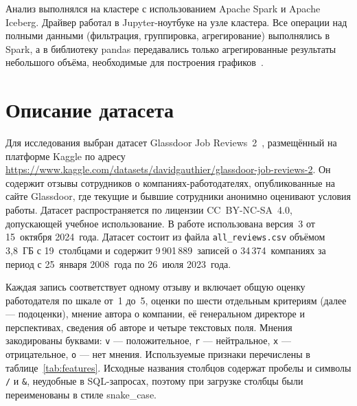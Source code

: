 Анализ выполнялся на кластере с использованием Apache Spark и Apache Iceberg. Драйвер работал в Jupyter-ноутбуке на узле кластера. Все операции над полными данными (фильтрация, группировка, агрегирование) выполнялись в Spark, а в библиотеку pandas передавались только агрегированные результаты небольшого объёма, необходимые для построения графиков~\cite{koirala2020pyspark, feng2021learning}.

\vspace{\baselineskip}\section{Описание датасета}\vspace{\baselineskip}

Для исследования выбран датасет Glassdoor Job Reviews~2~\cite{gauthier2024glassdoor}, размещённый на платформе Kaggle по адресу \url{https://www.kaggle.com/datasets/davidgauthier/glassdoor-job-reviews-2}. Он содержит отзывы сотрудников о компаниях-работодателях, опубликованные на сайте Glassdoor, где текущие и бывшие сотрудники анонимно оценивают условия работы. Датасет распространяется по лицензии CC~BY-NC-SA~4.0, допускающей учебное использование. В работе использована версия~3 от 15~октября 2024~года. Датасет состоит из файла \texttt{all\_reviews.csv} объёмом 3,8~ГБ с 19~столбцами и содержит 9\,901\,889~записей о 34\,374~компаниях за период с 25~января 2008~года по 26~июля 2023~года.

Каждая запись соответствует одному отзыву и включает общую оценку работодателя по шкале от~1 до~5, оценки по шести отдельным критериям (далее --- подоценки), мнение автора о компании, её генеральном директоре и перспективах, сведения об авторе и четыре текстовых поля. Мнения закодированы буквами: \texttt{v} --- положительное, \texttt{r} --- нейтральное, \texttt{x} --- отрицательное, \texttt{o} --- нет мнения. Используемые признаки перечислены в таблице~\ref{tab:features}. Исходные названия столбцов содержат пробелы и символы \texttt{/} и \texttt{\&}, неудобные в SQL-запросах, поэтому при загрузке столбцы были переименованы в стиле snake\_case.

